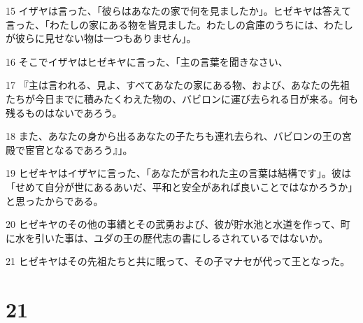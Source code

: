 \par 15 イザヤは言った、「彼らはあなたの家で何を見ましたか」。ヒゼキヤは答えて言った、「わたしの家にある物を皆見ました。わたしの倉庫のうちには、わたしが彼らに見せない物は一つもありません」。
\par 16 そこでイザヤはヒゼキヤに言った、「主の言葉を聞きなさい、
\par 17 『主は言われる、見よ、すべてあなたの家にある物、および、あなたの先祖たちが今日までに積みたくわえた物の、バビロンに運び去られる日が来る。何も残るものはないであろう。
\par 18 また、あなたの身から出るあなたの子たちも連れ去られ、バビロンの王の宮殿で宦官となるであろう』」。
\par 19 ヒゼキヤはイザヤに言った、「あなたが言われた主の言葉は結構です」。彼は「せめて自分が世にあるあいだ、平和と安全があれば良いことではなかろうか」と思ったからである。
\par 20 ヒゼキヤのその他の事績とその武勇および、彼が貯水池と水道を作って、町に水を引いた事は、ユダの王の歴代志の書にしるされているではないか。
\par 21 ヒゼキヤはその先祖たちと共に眠って、その子マナセが代って王となった。

\chapter{21}

